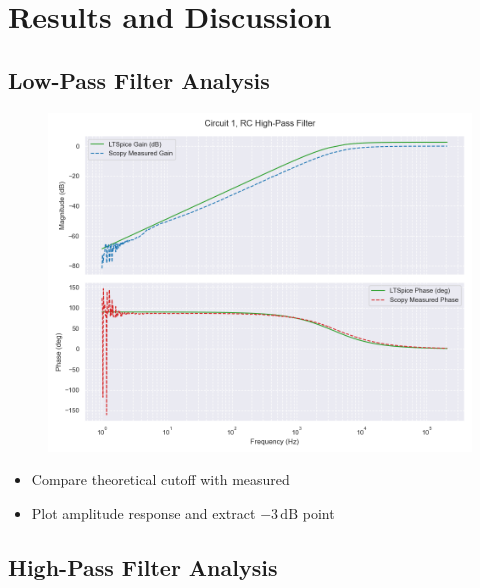 \documentclass[12pt]{article}
\begin{document}
\section{Results and Discussion}
\subsection{Low-Pass Filter Analysis}

\begin{figure}[H]
	\includegraphics[width=\textwidth]{e6_bode1}
\end{figure}
\begin{itemize}
	\item Compare theoretical cutoff with measured
	\item Plot amplitude response and extract $-3\,\mathrm{dB}$ point
\end{itemize}

\subsection{High-Pass Filter Analysis}
\end{document}

